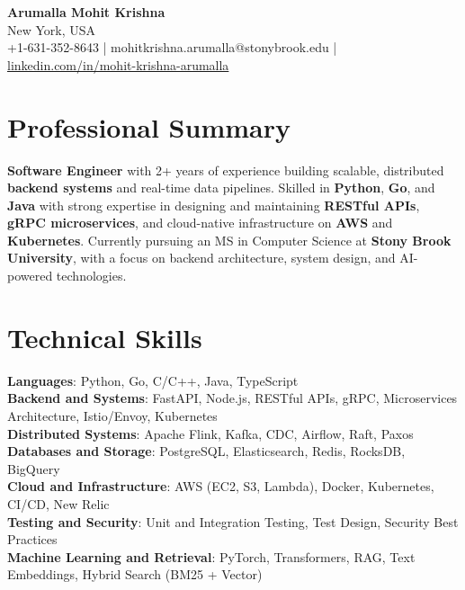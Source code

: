 \documentclass[letterpaper,11pt]{article}
\begin{document}
\begin{center}
  {\Large \textbf{Arumalla Mohit Krishna}} \\
  New York, USA \\
  +1-631-352-8643 \enspace | \enspace mohitkrishna.arumalla@stonybrook.edu \enspace | \enspace \href{https://www.linkedin.com/in/mohit-krishna-arumalla}{linkedin.com/in/mohit-krishna-arumalla}
\end{center}

\section{Professional Summary}
  \begin{itemize}[leftmargin=0.15in, label={}]
    \small{\item{
     \textbf{Software Engineer} with 2+ years of experience building scalable, distributed \textbf{backend systems} and real-time data pipelines. Skilled in \textbf{Python}, \textbf{Go}, and \textbf{Java} with strong expertise in designing and maintaining \textbf{RESTful APIs}, \textbf{gRPC microservices}, and cloud-native infrastructure on \textbf{AWS} and \textbf{Kubernetes}. Currently pursuing an MS in Computer Science at \textbf{Stony Brook University}, with a focus on backend architecture, system design, and AI-powered technologies.
    }}
  \end{itemize}
\vspace{-16pt}

\section{Technical Skills}
 \begin{itemize}[leftmargin=0.15in, label={}]
    \small{\item{
     \textbf{Languages}: Python, Go, C/C++, Java, TypeScript \\
     \textbf{Backend and Systems}: FastAPI, Node.js, RESTful APIs, gRPC, Microservices Architecture, Istio/Envoy, Kubernetes \\
     \textbf{Distributed Systems}: Apache Flink, Kafka, CDC, Airflow, Raft, Paxos \\
     \textbf{Databases and Storage}: PostgreSQL, Elasticsearch, Redis, RocksDB, BigQuery \\
     \textbf{Cloud and Infrastructure}: AWS (EC2, S3, Lambda), Docker, Kubernetes, CI/CD, New Relic \\
     \textbf{Testing and Security}: Unit and Integration Testing, Test Design, Security Best Practices \\
     \textbf{Machine Learning and Retrieval}: PyTorch, Transformers, RAG, Text Embeddings, Hybrid Search (BM25 + Vector)
    }}
 \end{itemize}
\vspace{-16pt}
\end{document}
